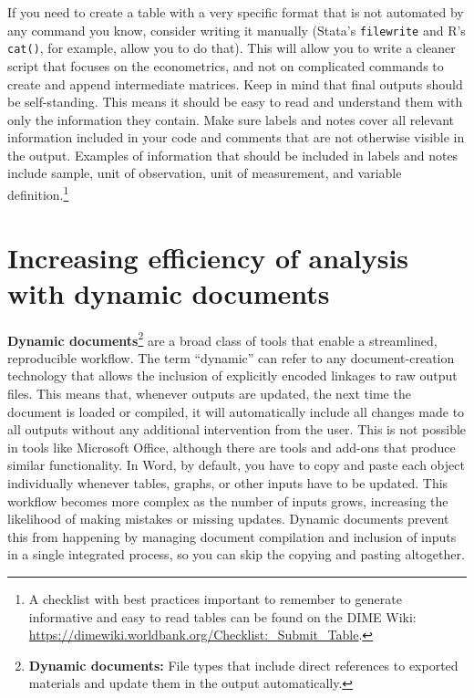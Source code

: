 \documentclass[
]{book}
\begin{document}
If you need to create a table with a very specific format
that is not automated by any command you know, consider writing it manually
(Stata's \texttt{filewrite} and R's \texttt{cat()}, for example, allow you to do that).
This will allow you to write a cleaner script that focuses on the econometrics,
and not on complicated commands to create and append intermediate matrices.
Keep in mind that final outputs should be self-standing.
This means it should be easy to read and understand them with only the information they contain.
Make sure labels and notes cover all relevant information
included in your code and comments that are not otherwise visible in the output.
Examples of information that should be included in labels and notes include sample,
unit of observation, unit of measurement, and variable definition.\footnote{A checklist with best practices important to remember
  to generate informative and easy to read tables
  can be found on the DIME Wiki:
  \url{https://dimewiki.worldbank.org/Checklist:_Submit_Table}.}

\hypertarget{increasing-efficiency-of-analysis-with-dynamic-documents}{%
\section*{Increasing efficiency of analysis with dynamic documents}\label{increasing-efficiency-of-analysis-with-dynamic-documents}}

\textbf{Dynamic documents}\footnote{\textbf{Dynamic documents:} File types that include direct references
  to exported materials and update them in the output automatically.}
are a broad class of tools that enable a streamlined, reproducible workflow.
The term ``dynamic'' can refer to any document-creation technology
that allows the inclusion of explicitly encoded linkages to raw output files.
This means that, whenever outputs are updated,
the next time the document is loaded or compiled, it will automatically include
all changes made to all outputs without any additional intervention from the user.
This is not possible in tools like Microsoft Office,
although there are tools and add-ons that produce similar functionality.
In Word, by default, you have to copy and paste each object individually
whenever tables, graphs, or other inputs have to be updated.
This workflow becomes more complex as the number of inputs grows,
increasing the likelihood of making mistakes or missing updates.
Dynamic documents prevent this from happening by managing document compilation and
inclusion of inputs in a single integrated process,
so you can skip the copying and pasting altogether.
\end{document}
